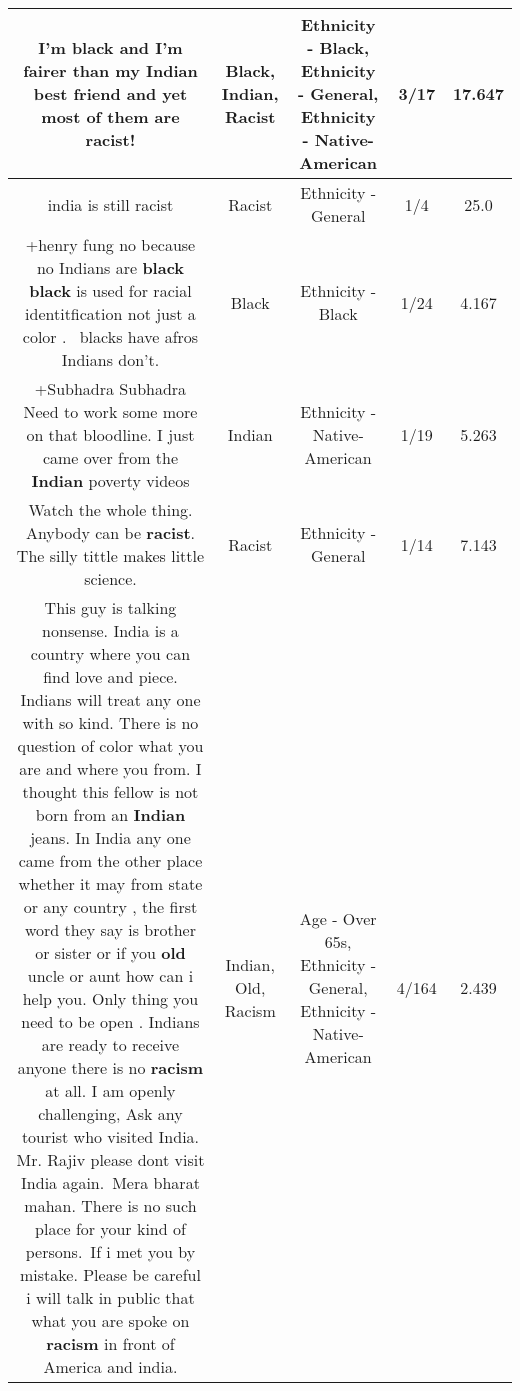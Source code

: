 \documentclass[11pt]{article}
\newlength\mylength
\begin{document}
\begin{center}
\begin{longtable}{|C{.65\mylength}|C{.30\mylength}|C{.12\mylength}|C{.12\mylength}|C{.12\mylength}|}
  \small I'm \textbf{black} and I'm fairer than my \textbf{Indian} best friend and yet most of them are \textbf{racist}!\normalsize   & Black, Indian, Racist & Ethnicity - Black, Ethnicity - General, Ethnicity - Native-American & 3/17 & 17.647 \\  \hline
  \small india is still racist\normalsize   & Racist & Ethnicity - General & 1/4 & 25.0 \\  \hline
  \small +henry fung no because no Indians are \textbf{black} \textbf{black} is used for racial identitfication not just a color .  blacks have afros Indians don't.\normalsize   & Black & Ethnicity - Black & 1/24 & 4.167 \\  \hline
  \small +Subhadra Subhadra Need to work some more on that bloodline. I just came over from the \textbf{Indian} poverty videos\normalsize   & Indian & Ethnicity - Native-American & 1/19 & 5.263 \\  \hline
  \small Watch the whole thing. Anybody can be \textbf{racist}. The silly tittle makes little science.\normalsize   & Racist & Ethnicity - General & 1/14 & 7.143 \\  \hline
  \small This guy is talking nonsense. India is a country where you can find love and piece. Indians will treat any one with so kind. There is no question  of color what you are and  where you from. I thought this fellow is not  born from an \textbf{Indian} jeans. In India any one came from the other place whether it may from state or any country , the first word they say is brother or sister or if you \textbf{old} uncle or aunt how can i help you. Only thing you need to be open . Indians  are ready to receive anyone there is no \textbf{racism} at all. I am openly challenging, Ask any tourist who visited India. Mr. Rajiv please dont visit India again. Mera bharat mahan. There is no such place for your kind of persons. If i met you by mistake. Please be careful i will talk in public that what you are spoke on \textbf{racism} in front of America and india.\normalsize   & Indian, Old, Racism & Age - Over 65s, Ethnicity - General, Ethnicity - Native-American & 4/164 & 2.439 \\  \hline

\end{longtable}
\end{center}
\end{document}
